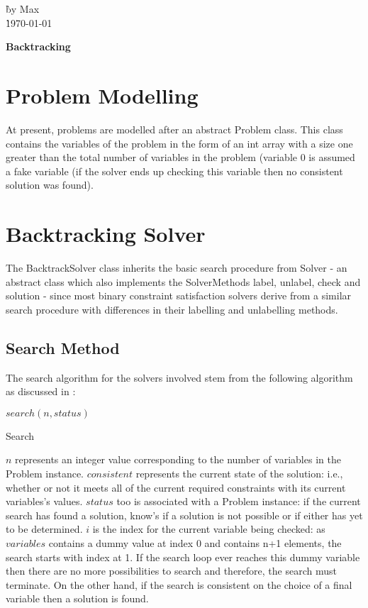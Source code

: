 \documentclass{article}
\begin{document}
\begin{tabbing}
\` by Max\\
\` \today \\
\end{tabbing}
\begin{Large}
\begin{center}
{\bf Backtracking}
\end{center}
\end{Large}
\section*{Problem Modelling}
At present, problems are modelled after an abstract Problem class. This class contains the variables of the problem in the form of an int array with a size one greater than the total number of variables in the problem (variable 0 is assumed a fake variable (if the solver ends up checking this variable then no consistent solution was found).
\section*{Backtracking Solver}
The BacktrackSolver class inherits the basic search procedure from Solver - an abstract class which also implements the SolverMethods label, unlabel, check and solution - since most binary constraint satisfaction solvers derive from a similar search procedure with differences in their labelling and unlabelling methods.
\subsection*{Search Method}
The search algorithm for the solvers involved stem from the following algorithm as discussed in \cite{Prosser93}:
\begin{algorithm}
\DontPrintSemicolon
\nl $search(n,status)$ \;
\nl {}
\caption{Search}
\label{bcSearch}
\end{algorithm}
$n$ represents an integer value corresponding to the number of variables in the Problem instance. $consistent$ represents the current state of the solution: i.e., whether or not it meets all of the current required constraints with its current variables's values. $status$ too is associated with a Problem instance: if the current search has found a solution, know's if a solution is not possible or if either has yet to be determined. $i$ is the index for the current variable being checked: as $variables$ contains a dummy value at index 0 and contains n+1 elements, the search starts with index at 1. If the search loop ever reaches this dummy variable then there are no more possibilities to search and therefore, the search must terminate. On the other hand, if the search is consistent on the choice of a final variable then a solution is found.
\end{document}
